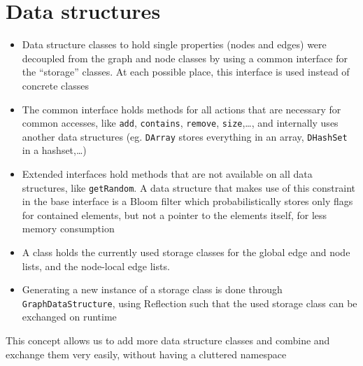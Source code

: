 \section{Data structures}
	\begin{itemize}
		\item Data structure classes to hold single properties (nodes and edges) were decoupled
			from the graph and node classes by using a common interface for the ``storage''
			classes. At each possible place, this interface is used instead of concrete classes
		\item The common interface holds methods for all actions that are necessary for common
			accesses, like \texttt{add}, \texttt{contains}, \texttt{remove}, \texttt{size},\ldots,
			and internally uses another data structures (eg. \texttt{DArray} stores everything in
			an array, \texttt{DHashSet} in a hashset,\ldots)
		\item Extended interfaces hold methods that are not available on all data structures,
			like \texttt{getRandom}. A data structure that makes use of this constraint in the base
			interface is a Bloom filter which probabilistically stores only flags for contained
			elements, but not a pointer to the elements itself, for less memory consumption
		\item A class holds the currently used storage classes for the global edge and node
			lists, and the node-local edge lists.
		\item Generating a new instance of a storage class is done through
			\texttt{GraphDataStructure}, using Reflection such that the used storage class can be
			exchanged on runtime
	\end{itemize}
	
	This concept allows us to add more data structure classes and combine and exchange them
	very easily, without having a cluttered namespace
